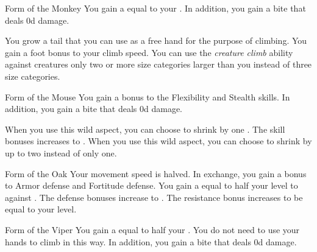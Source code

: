 {            %
            \begin{freeability}{Form of the Monkey}
                You gain a  equal to your .
                In addition, you gain a bite  that deals \plus0d damage.

                \rankline
                 You grow a tail that you can use as a free hand for the purpose of climbing.
                 You gain a  foot bonus to your climb speed.
                 You can use the \textit{creature climb} ability against creatures only two or more size categories larger than you instead of three size categories.
            \end{freeability}

            \begin{freeability}{Form of the Mouse}
                You gain a  bonus to the Flexibility and Stealth skills.
                In addition, you gain a bite  that deals \plus0d damage.
                
                \rankline
                 When you use this wild aspect, you can choose to shrink by one .
                 The skill bonuses increases to .
                 When you use this wild aspect, you can choose to shrink by up to two  instead of only one.
            \end{freeability}

            \begin{freeability}{Form of the Oak}
                Your movement speed is halved.
                In exchange, you gain a  bonus to Armor defense and Fortitude defense.
                \rankline
                 You gain a  equal to half your level to  against .
                 The defense bonuses increase to .
                 The resistance bonus increases to be equal to your level.
            \end{freeability}

            \begin{freeability}{Form of the Viper}
                You gain a  equal to half your .
                You do not need to use your hands to climb in this way.
                In addition, you gain a bite  that deals \plus0d damage.


\end{freeability}}
